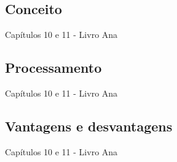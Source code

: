     \subsection{Conceito}
      Capítulos 10 e 11 - Livro Ana
    

    \subsection{Processamento}
      Capítulos 10 e 11 - Livro Ana


    \subsection{Vantagens e desvantagens}
      Capítulos 10 e 11 - Livro Ana